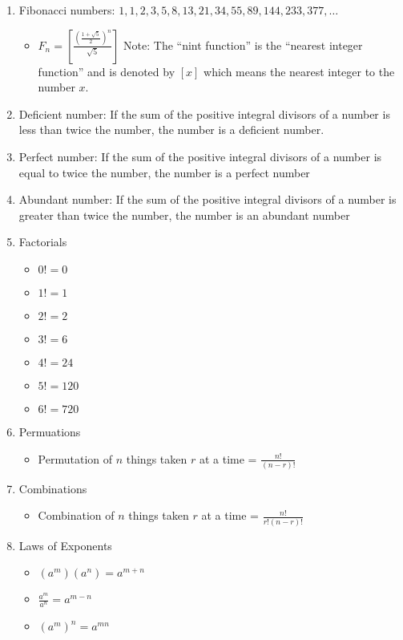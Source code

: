 \documentclass[../uilmath.tex]{subfiles}
\begin{document}
\begin{enumerate}
    \item Fibonacci numbers: $1,1,2,3,5,8,13,21,34,55,89,144,233,377,\dots$
    \begin{itemize}
        \item $F_n = \left[\frac{\left(\frac{1+\sqrt{5}}{2}\right)^n}{\sqrt{5}}\right]$ Note: The ``nint function'' is the ``nearest integer function'' and is denoted by $[x]$
        which means the nearest integer to the number $x$.
    \end{itemize}
    \item Deficient number: If the sum of the positive integral divisors of a number is less than twice the number, the number is a deficient number.
    \item Perfect number: If the sum of the positive integral divisors of a number is equal to twice the number, the number is a perfect number 
    \item Abundant number: If the sum of the positive integral divisors of a number is greater than twice the number, the number is an abundant number 
    \item Factorials
    \begin{itemize}
        \item $0!=0$
        \item $1!=1$
        \item $2!=2$
        \item $3!=6$
        \item $4!=24$
        \item $5!=120$
        \item $6!=720$
    \end{itemize}
    \item Permuations 
    \begin{itemize}
        \item Permutation of $n$ things taken $r$ at a time = $\frac{n!}{(n-r)!}$
    \end{itemize}
    \item Combinations 
    \begin{itemize}
        \item Combination of $n$ things taken $r$ at a time = $\frac{n!}{r!(n-r)!}$
    \end{itemize}
    \item Laws of Exponents
    \begin{itemize}
        \item $(a^m)(a^n)=a^{m+n}$
        \item $\frac{a^m}{a^n}=a^{m-n}$
        \item $(a^m)^n=a^{mn}$

\end{itemize}
\end{enumerate}
\end{document}

